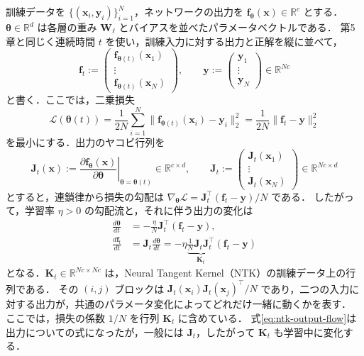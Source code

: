 \documentclass[../main.tex]{subfiles}
\begin{document}
訓練データを $\{(\bm{x}_i,\bm{y}_i)\}_{i=1}^N$，ネットワークの出力を $\bm{f}_{\bm{\theta}}(\bm{x})\in\mathbb{R}^c$ とする．
$\bm{\theta}\in\mathbb{R}^d$ は各層の重み $\bm{W}_\ell$ とバイアスを並べたパラメータベクトルである．
第5章と同じく連続時間 $t$ を使い，訓練入力に対する出力と正解を縦に並べて，
\begin{equation}
  \bm{f}_t:=\begin{pmatrix}
    \bm{f}_{\bm{\theta}(t)}(\bm{x}_1)\\ \vdots\\
    \bm{f}_{\bm{\theta}(t)}(\bm{x}_N)
  \end{pmatrix},
  \qquad
  \bm{y}:=\begin{pmatrix}\bm{y}_1\\ \vdots\\ \bm{y}_N\end{pmatrix}
  \in\mathbb{R}^{Nc}
  \label{eq:ntk-stacked-output}
\end{equation}
と書く．ここでは，二乗損失
\begin{equation}
  \mathcal{L}(\bm{\theta}(t))
  =\frac{1}{2N}\sum_{i=1}^N
    \|\bm{f}_{\bm{\theta}(t)}(\bm{x}_i)-\bm{y}_i\|_2^2
  =\frac{1}{2N}\|\bm{f}_t-\bm{y}\|_2^2
  \label{eq:ntk-loss}
\end{equation}
を最小にする．出力のヤコビ行列を
\begin{equation}
  \bm{J}_t(\bm{x})
  :=\left.\frac{\partial\bm{f}_{\bm{\theta}}(\bm{x})}
    {\partial\bm{\theta}}\right|_{\bm{\theta}=\bm{\theta}(t)}
  \in\mathbb{R}^{c\times d},
  \qquad
  \bm{J}_t:=\begin{pmatrix}
    \bm{J}_t(\bm{x}_1)\\ \vdots\\ \bm{J}_t(\bm{x}_N)
  \end{pmatrix}\in\mathbb{R}^{Nc\times d}
  \label{eq:ntk-jacobian}
\end{equation}
とすると，連鎖律から損失の勾配は $\nabla_{\bm{\theta}}\mathcal{L}=\bm{J}_t^\top(\bm{f}_t-\bm{y})/N$ である．
したがって，学習率 $\eta>0$ の勾配流と，それに伴う出力の変化は
\begin{align}
  \frac{d\bm{\theta}}{dt}
  &=-\frac{\eta}{N}\bm{J}_t^\top(\bm{f}_t-\bm{y}),
  \label{eq:ntk-parameter-flow}\\
  \frac{d\bm{f}_t}{dt}
  &=\bm{J}_t\frac{d\bm{\theta}}{dt}
  =-\eta\underbrace{\frac1N\bm{J}_t\bm{J}_t^\top}_{\displaystyle\bm{K}_t}
    (\bm{f}_t-\bm{y})
  \label{eq:ntk-output-flow}
\end{align}
となる．$\bm{K}_t\in\mathbb{R}^{Nc\times Nc}$ は，Neural Tangent Kernel（NTK）の訓練データ上の行列である．
その $(i,j)$ ブロックは $\bm{J}_t(\bm{x}_i)\bm{J}_t(\bm{x}_j)^\top/N$ であり，二つの入力に対する出力が，共通のパラメータ変化によってどれだけ一緒に動くかを表す．
ここでは，損失の係数 $1/N$ を行列 $\bm{K}_t$ に含めている．
式\eqref{eq:ntk-output-flow}は出力についての式になったが，一般には $\bm{J}_t$，したがって $\bm{K}_t$ も学習中に変化する．
\end{document}
